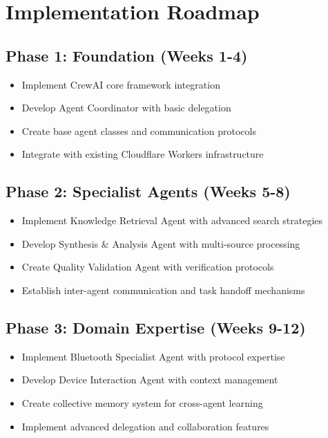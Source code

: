 \documentclass[11pt, a4paper]{article}
\begin{document}
\section{Implementation Roadmap}

\subsection{Phase 1: Foundation (Weeks 1-4)}
\begin{itemize}
    \item Implement CrewAI core framework integration
    \item Develop Agent Coordinator with basic delegation
    \item Create base agent classes and communication protocols
    \item Integrate with existing Cloudflare Workers infrastructure
\end{itemize}

\subsection{Phase 2: Specialist Agents (Weeks 5-8)}
\begin{itemize}
    \item Implement Knowledge Retrieval Agent with advanced search strategies
    \item Develop Synthesis \& Analysis Agent with multi-source processing
    \item Create Quality Validation Agent with verification protocols
    \item Establish inter-agent communication and task handoff mechanisms
\end{itemize}

\subsection{Phase 3: Domain Expertise (Weeks 9-12)}
\begin{itemize}
    \item Implement Bluetooth Specialist Agent with protocol expertise
    \item Develop Device Interaction Agent with context management
    \item Create collective memory system for cross-agent learning
    \item Implement advanced delegation and collaboration features
\end{itemize}
\end{document}
